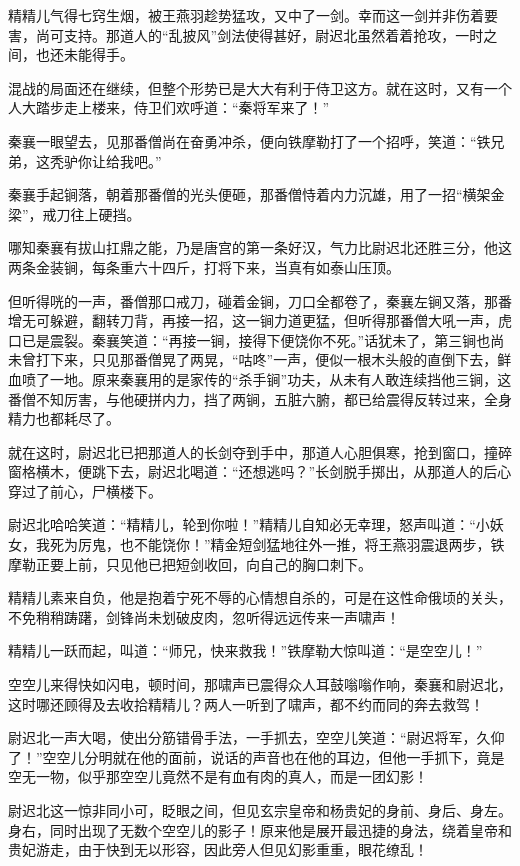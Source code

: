 \documentclass[12pt,oneside]{book}
\begin{document}
精精儿气得七窍生烟，被王燕羽趁势猛攻，又中了一剑。幸而这一剑并非伤着要害，尚可支持。那道人的``乱披风''剑法使得甚好，尉迟北虽然着着抢攻，一时之间，也还未能得手。

混战的局面还在继续，但整个形势已是大大有利于侍卫这方。就在这时，又有一个人大踏步走上楼来，侍卫们欢呼道：``秦将军来了！''

秦襄一眼望去，见那番僧尚在奋勇冲杀，便向铁摩勒打了一个招呼，笑道：``铁兄弟，这秃驴你让给我吧。''

秦襄手起锏落，朝着那番僧的光头便砸，那番僧恃着内力沉雄，用了一招``横架金梁''，戒刀往上硬挡。

哪知秦襄有拔山扛鼎之能，乃是唐宫的第一条好汉，气力比尉迟北还胜三分，他这两条金装锏，每条重六十四斤，打将下来，当真有如泰山压顶。

但听得咣的一声，番僧那口戒刀，碰着金锏，刀口全都卷了，秦襄左锏又落，那番增无可躲避，翻转刀背，再接一招，这一锏力道更猛，但听得那番僧大吼一声，虎口已是震裂。秦襄笑道：``再接一锏，接得下便饶你不死。''话犹未了，第三锏也尚未曾打下来，只见那番僧晃了两晃，``咕咚''一声，便似一根木头般的直倒下去，鲜血喷了一地。原来秦襄用的是家传的``杀手锏''功夫，从未有人敢连续挡他三锏，这番僧不知厉害，与他硬拼内力，挡了两锏，五脏六腑，都已给震得反转过来，全身精力也都耗尽了。

就在这时，尉迟北已把那道人的长剑夺到手中，那道人心胆俱寒，抢到窗口，撞碎窗格横木，便跳下去，尉迟北喝道：``还想逃吗？''长剑脱手掷出，从那道人的后心穿过了前心，尸横楼下。

尉迟北哈哈笑道：``精精儿，轮到你啦！''精精儿自知必无幸理，怒声叫道：``小妖女，我死为厉鬼，也不能饶你！''精金短剑猛地往外一推，将王燕羽震退两步，铁摩勒正要上前，只见他已把短剑收回，向自己的胸口刺下。

精精儿素来自负，他是抱着宁死不辱的心情想自杀的，可是在这性命俄顷的关头，不免稍稍踌躇，剑锋尚未划破皮肉，忽听得远远传来一声啸声！

精精儿一跃而起，叫道：``师兄，快来救我！''铁摩勒大惊叫道：``是空空儿！''

空空儿来得快如闪电，顿时间，那啸声已震得众人耳鼓嗡嗡作响，秦襄和尉迟北，这时哪还顾得及去收拾精精儿？两人一听到了啸声，都不约而同的奔去救驾！

尉迟北一声大喝，使出分筋错骨手法，一手抓去，空空儿笑道：``尉迟将军，久仰了！''空空儿分明就在他的面前，说话的声音也在他的耳边，但他一手抓下，竟是空无一物，似乎那空空儿竟然不是有血有肉的真人，而是一团幻影！

尉迟北这一惊非同小可，眨眼之间，但见玄宗皇帝和杨贵妃的身前、身后、身左。身右，同时出现了无数个空空儿的影子！原来他是展开最迅捷的身法，绕着皇帝和贵妃游走，由于快到无以形容，因此旁人但见幻影重重，眼花缭乱！
\end{document}
